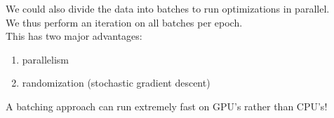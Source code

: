 \documentclass[../../lecture_notes.tex]{subfiles}
\begin{document}
\noindent We could also divide the data into batches to run optimizations in parallel.\\
We thus perform an iteration on all batches per epoch.\\
This has two major advantages:
	\begin{enumerate} [itemsep=0mm]
		\item parallelism
		\item randomization (stochastic gradient descent)
	\end{enumerate}
\noindent A batching approach can run extremely fast on GPU’s rather than CPU’s!
\end{document}
